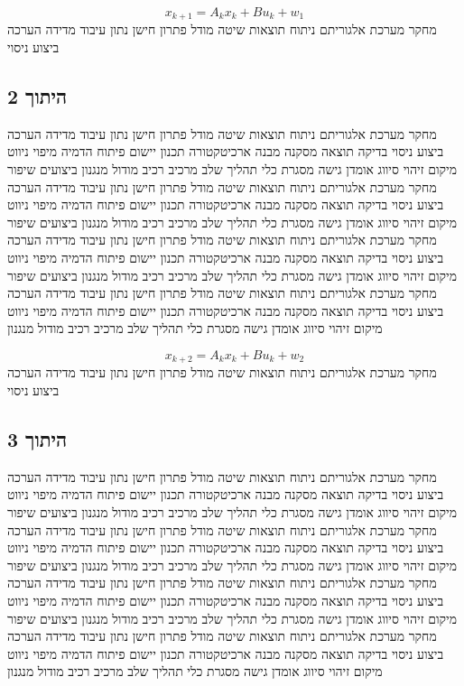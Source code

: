 \begin{equation}
    x_{k+1} = A_{k} x_k + B u_{k} + w_{1}
    \label{eq:ch05_1}
\end{equation}
מחקר מערכת אלגוריתם ניתוח תוצאות שיטה מודל פתרון חישן נתון עיבוד מדידה הערכה ביצוע ניסוי

\subsection{היתוך 2}
\label{sub:ch05_2}
מחקר מערכת אלגוריתם ניתוח תוצאות שיטה מודל פתרון חישן נתון עיבוד מדידה הערכה ביצוע ניסוי בדיקה תוצאה מסקנה מבנה ארכיטקטורה תכנון יישום פיתוח הדמיה מיפוי ניווט מיקום זיהוי סיווג אומדן גישה מסגרת כלי תהליך שלב מרכיב רכיב מודול מנגנון ביצועים שיפור מחקר מערכת אלגוריתם ניתוח תוצאות שיטה מודל פתרון חישן נתון עיבוד מדידה הערכה ביצוע ניסוי בדיקה תוצאה מסקנה מבנה ארכיטקטורה תכנון יישום פיתוח הדמיה מיפוי ניווט מיקום זיהוי סיווג אומדן גישה מסגרת כלי תהליך שלב מרכיב רכיב מודול מנגנון ביצועים שיפור מחקר מערכת אלגוריתם ניתוח תוצאות שיטה מודל פתרון חישן נתון עיבוד מדידה הערכה ביצוע ניסוי בדיקה תוצאה מסקנה מבנה ארכיטקטורה תכנון יישום פיתוח הדמיה מיפוי ניווט מיקום זיהוי סיווג אומדן גישה מסגרת כלי תהליך שלב מרכיב רכיב מודול מנגנון ביצועים שיפור מחקר מערכת אלגוריתם ניתוח תוצאות שיטה מודל פתרון חישן נתון עיבוד מדידה הערכה ביצוע ניסוי בדיקה תוצאה מסקנה מבנה ארכיטקטורה תכנון יישום פיתוח הדמיה מיפוי ניווט מיקום זיהוי סיווג אומדן גישה מסגרת כלי תהליך שלב מרכיב רכיב מודול מנגנון

\begin{equation}
    x_{k+2} = A_{k} x_k + B u_{k} + w_{2}
    \label{eq:ch05_2}
\end{equation}
מחקר מערכת אלגוריתם ניתוח תוצאות שיטה מודל פתרון חישן נתון עיבוד מדידה הערכה ביצוע ניסוי

\subsection{היתוך 3}
\label{sub:ch05_3}
מחקר מערכת אלגוריתם ניתוח תוצאות שיטה מודל פתרון חישן נתון עיבוד מדידה הערכה ביצוע ניסוי בדיקה תוצאה מסקנה מבנה ארכיטקטורה תכנון יישום פיתוח הדמיה מיפוי ניווט מיקום זיהוי סיווג אומדן גישה מסגרת כלי תהליך שלב מרכיב רכיב מודול מנגנון ביצועים שיפור מחקר מערכת אלגוריתם ניתוח תוצאות שיטה מודל פתרון חישן נתון עיבוד מדידה הערכה ביצוע ניסוי בדיקה תוצאה מסקנה מבנה ארכיטקטורה תכנון יישום פיתוח הדמיה מיפוי ניווט מיקום זיהוי סיווג אומדן גישה מסגרת כלי תהליך שלב מרכיב רכיב מודול מנגנון ביצועים שיפור מחקר מערכת אלגוריתם ניתוח תוצאות שיטה מודל פתרון חישן נתון עיבוד מדידה הערכה ביצוע ניסוי בדיקה תוצאה מסקנה מבנה ארכיטקטורה תכנון יישום פיתוח הדמיה מיפוי ניווט מיקום זיהוי סיווג אומדן גישה מסגרת כלי תהליך שלב מרכיב רכיב מודול מנגנון ביצועים שיפור מחקר מערכת אלגוריתם ניתוח תוצאות שיטה מודל פתרון חישן נתון עיבוד מדידה הערכה ביצוע ניסוי בדיקה תוצאה מסקנה מבנה ארכיטקטורה תכנון יישום פיתוח הדמיה מיפוי ניווט מיקום זיהוי סיווג אומדן גישה מסגרת כלי תהליך שלב מרכיב רכיב מודול מנגנון

